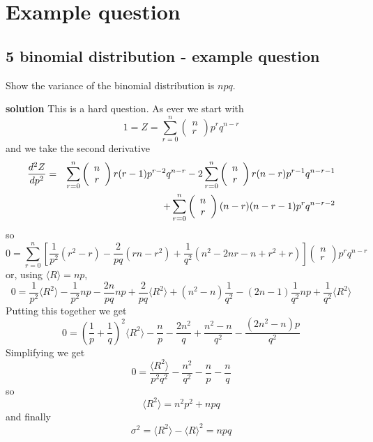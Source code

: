 
\ifind
\section*{Example question}
\else
\subsection*{5 binomial distribution - example question}
\fi
Show the variance of the binomial distribution is $npq$.

\noindent \textbf{solution}
This is a hard question. As ever we start with
\begin{equation}
1=Z=\sum_{r=0}^n \left(\begin{array}{c} n\\r\end{array}\right) p^rq^{n-r}
\end{equation}
and we take the second derivative
\begin{eqnarray}
\frac{d^2Z}{dp^2}&=&\sum_{r=0}^n \left(\begin{array}{c} n\\r\end{array}\right) r(r-1)p^{r-2}q^{n-r}-2\sum_{r=0}^n \left(\begin{array}{c} n\\r\end{array}\right) r(n-r)p^{r-1}q^{n-r-1}\cr&&+\sum_{r=0}^n \left(\begin{array}{c} n\\r\end{array}\right)(n-r)(n-r-1) p^rq^{n-r-2}
\end{eqnarray}
so
\begin{equation}
0=\sum_{r=0}^n\left[\frac{1}{p^2}(r^2-r)-\frac{2}{pq}(rn-r^2)+\frac{1}{q^2}(n^2-2nr-n+r^2+r)\right]\left(\begin{array}{c} n\\r\end{array}\right) p^rq^{n-r}
\end{equation}
or, using $\langle R\rangle = np$,
\begin{equation}
0=\frac{1}{p^2}\langle R^2\rangle - \frac{1}{p^2}np-\frac{2n}{pq}np+\frac{2}{pq}\langle R^2\rangle +(n^2-n)\frac{1}{q^2}-(2n-1)\frac{1}{q^2}np+\frac{1}{q^2}\langle R^2\rangle
\end{equation}
Putting this together we get
\begin{equation}
0=\left(\frac{1}{p}+\frac{1}{q}\right)^2\langle R^2\rangle - \frac{n}{p}-\frac{2n^2}{q}+ \frac{n^2-n}{q^2}-\frac{(2n^2-n)p}{q^2}
\end{equation}
Simplifying we get
\begin{equation}
0=\frac{\langle R^2\rangle}{p^2q^2}-\frac{n^2}{q^2}-\frac{n}{p}-\frac{n}{q}
\end{equation}
so
\begin{equation}
\langle R^2\rangle=n^2p^2+npq
\end{equation}
and finally
\begin{equation}
\sigma^2=\langle R^2\rangle-\langle R\rangle^2=npq
\end{equation}



